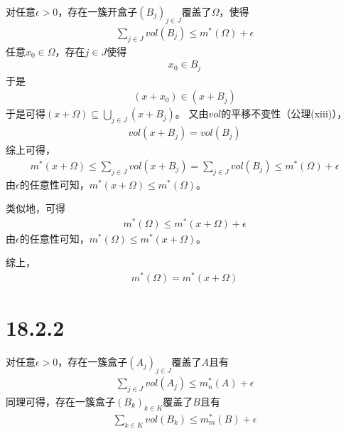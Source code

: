 \documentclass{article}
\begin{document}
\begin{itemize}
        对任意$\epsilon > 0$，存在一簇开盒子$(B_j)_{j \in J}$覆盖了$\Omega$，使得
        \begin{align*}
          \sum\limits_{j \in J} vol(B_j) \leq m^{\ast}(\Omega) + \epsilon
        \end{align*}
        任意$x_0 \in \Omega$，存在$j \in J$使得
        \begin{align*}
          x_0 \in B_j
        \end{align*}
        于是
        \begin{align*}
          (x + x_0) \in (x + B_j)
        \end{align*}
        于是可得$(x + \Omega) \subseteq \bigcup \limits_{j \in J} (x + B_j)$。
        又由$vol$的平移不变性（公理(xiii)），
        \begin{align*}
          vol(x + B_j)  = vol(B_j)
        \end{align*}
        综上可得，
        \begin{align*}
          m^{\ast}(x + \Omega) \leq \sum\limits_{j \in J} vol(x + B_j) = \sum\limits_{j \in J} vol(B_j) \leq m^{\ast}(\Omega) + \epsilon
        \end{align*}
        由$\epsilon$的任意性可知，$m^{\ast}(x + \Omega) \leq m^{\ast}(\Omega)$。

        类似地，可得
        \begin{align*}
          m^{\ast}(\Omega) \leq m^{\ast}(x + \Omega) + \epsilon
        \end{align*}
        由$\epsilon$的任意性可知，$m^{\ast}(\Omega) \leq m^{\ast}(x + \Omega)$。

        综上，
        \begin{align*}
          m^{\ast}(\Omega) = m^{\ast}(x + \Omega)
        \end{align*}
\end{itemize}

\section*{18.2.2}


对任意$\epsilon > 0$，存在一簇盒子$(A_j)_{j \in J}$覆盖了$A$且有
\begin{align*}
  \sum\limits_{j \in J} vol(A_j) \leq m^{\ast}_{n}(A) + \epsilon
\end{align*}
同理可得，存在一簇盒子$(B_k)_{k \in K}$覆盖了$B$且有
\begin{align*}
  \sum\limits_{k \in K} vol(B_k) \leq m^{\ast}_{m}(B) + \epsilon
\end{align*}
\end{document}
